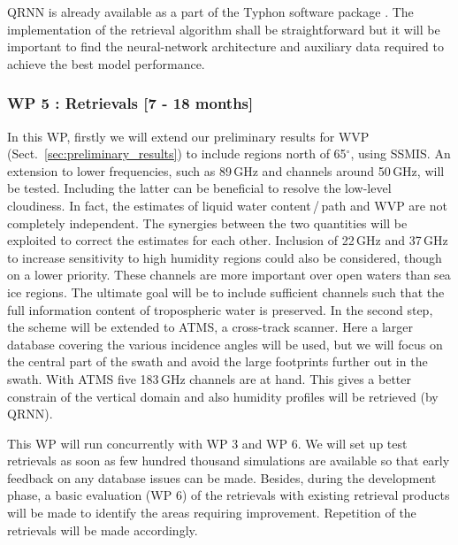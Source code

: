 \documentclass[12pt,oneside,a4paper]{article}
\begin{document}
QRNN is already available as a part of the Typhon software package
\citep{lemke:2020:typhon}. The implementation of the retrieval algorithm shall
be straightforward but it will be important to find the
neural-network architecture and auxiliary data required to achieve the best model performance.



\vspace{-1.0ex}
\subsubsection*{WP 5 : Retrievals [7 - 18 months]}
%
\label{sec:retrievals}
%
In this WP, firstly we will extend our preliminary results for WVP
(Sect.~\ref{sec:preliminary_results}) to include regions north of 65$^\circ$,
using SSMIS. An extension to lower frequencies, such as 89\,GHz and channels
around 50\,GHz, will be tested. Including the latter can be beneficial to
resolve the low-level cloudiness. In fact, the estimates of liquid water
content\,/\,path and WVP are not completely independent. The synergies between the
two quantities will be exploited to correct the estimates for each other.
Inclusion of 22\,GHz and 37\,GHz to increase sensitivity to high humidity
regions could also be considered, though on a lower priority. These channels
are more important over open waters than sea ice regions. The ultimate goal
will be to include sufficient channels such that the full information content
of tropospheric water is preserved. In the second step, the scheme will be
extended to ATMS, a cross-track scanner. Here a larger database covering the
various incidence angles will be used, but we will focus on the central part of
the swath and avoid the large footprints further out in the swath. With ATMS
five 183\,GHz channels are at hand. This gives a better constrain of the
vertical domain and also humidity profiles will be retrieved (by QRNN).

This WP will run concurrently with WP 3 and WP 6. We will set up test retrievals as soon as few hundred thousand simulations are available so that early feedback on any database issues can be made. Besides, during the development phase, a basic evaluation (WP 6) of the retrievals with existing retrieval products will be made to identify the areas requiring improvement. Repetition of the retrievals will be made accordingly.
\end{document}
